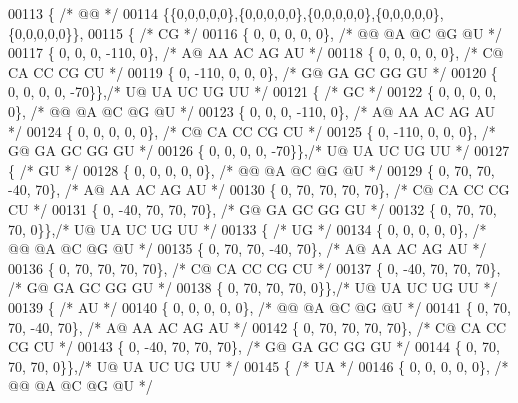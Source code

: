 \begin{DoxyCode}
00113 \{ \textcolor{comment}{/* @@ */}
00114   \{\{0,0,0,0,0\},\{0,0,0,0,0\},\{0,0,0,0,0\},\{0,0,0,0,0\},\{0,0,0,0,0\}\},
00115   \{ \textcolor{comment}{/* CG */}
00116    \{   0,    0,    0,    0,    0\}, \textcolor{comment}{/* @@  @A  @C  @G  @U */}
00117    \{   0,    0,    0, -110,    0\}, \textcolor{comment}{/* A@  AA  AC  AG  AU */}
00118    \{   0,    0,    0,    0,    0\}, \textcolor{comment}{/* C@  CA  CC  CG  CU */}
00119    \{   0, -110,    0,    0,    0\}, \textcolor{comment}{/* G@  GA  GC  GG  GU */}
00120    \{   0,    0,    0,    0,  -70\}\},\textcolor{comment}{/* U@  UA  UC  UG  UU */}
00121   \{ \textcolor{comment}{/* GC */}
00122    \{   0,    0,    0,    0,    0\}, \textcolor{comment}{/* @@  @A  @C  @G  @U */}
00123    \{   0,    0,    0, -110,    0\}, \textcolor{comment}{/* A@  AA  AC  AG  AU */}
00124    \{   0,    0,    0,    0,    0\}, \textcolor{comment}{/* C@  CA  CC  CG  CU */}
00125    \{   0, -110,    0,    0,    0\}, \textcolor{comment}{/* G@  GA  GC  GG  GU */}
00126    \{   0,    0,    0,    0,  -70\}\},\textcolor{comment}{/* U@  UA  UC  UG  UU */}
00127   \{ \textcolor{comment}{/* GU */}
00128    \{   0,    0,    0,    0,    0\}, \textcolor{comment}{/* @@  @A  @C  @G  @U */}
00129    \{   0,   70,   70,  -40,   70\}, \textcolor{comment}{/* A@  AA  AC  AG  AU */}
00130    \{   0,   70,   70,   70,   70\}, \textcolor{comment}{/* C@  CA  CC  CG  CU */}
00131    \{   0,  -40,   70,   70,   70\}, \textcolor{comment}{/* G@  GA  GC  GG  GU */}
00132    \{   0,   70,   70,   70,    0\}\},\textcolor{comment}{/* U@  UA  UC  UG  UU */}
00133   \{ \textcolor{comment}{/* UG */}
00134    \{   0,    0,    0,    0,    0\}, \textcolor{comment}{/* @@  @A  @C  @G  @U */}
00135    \{   0,   70,   70,  -40,   70\}, \textcolor{comment}{/* A@  AA  AC  AG  AU */}
00136    \{   0,   70,   70,   70,   70\}, \textcolor{comment}{/* C@  CA  CC  CG  CU */}
00137    \{   0,  -40,   70,   70,   70\}, \textcolor{comment}{/* G@  GA  GC  GG  GU */}
00138    \{   0,   70,   70,   70,    0\}\},\textcolor{comment}{/* U@  UA  UC  UG  UU */}
00139   \{ \textcolor{comment}{/* AU */}
00140    \{   0,    0,    0,    0,    0\}, \textcolor{comment}{/* @@  @A  @C  @G  @U */}
00141    \{   0,   70,   70,  -40,   70\}, \textcolor{comment}{/* A@  AA  AC  AG  AU */}
00142    \{   0,   70,   70,   70,   70\}, \textcolor{comment}{/* C@  CA  CC  CG  CU */}
00143    \{   0,  -40,   70,   70,   70\}, \textcolor{comment}{/* G@  GA  GC  GG  GU */}
00144    \{   0,   70,   70,   70,    0\}\},\textcolor{comment}{/* U@  UA  UC  UG  UU */}
00145   \{ \textcolor{comment}{/* UA */}
00146    \{   0,    0,    0,    0,    0\}, \textcolor{comment}{/* @@  @A  @C  @G  @U */}

\end{DoxyCode}
